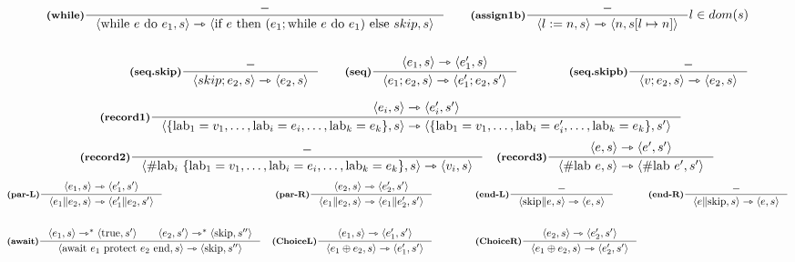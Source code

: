 \documentclass[a4paper, 10pt]{article}
\theoremstyle{definition}
\newcommand{\infer}[4]{\inference[\textbf{#1}]{#2}{#3}#4 }
\newcommand{\srule}[2]{\langle #1 \rangle \rightarrowtriangle \langle #2 \rangle}
\newcommand{\ssrule}[2]{\langle #1 \rangle \rightarrowtriangle^{*} \langle #2 \rangle}
\newcommand{\memrep}[3]{#1 \lbrack #2 \mapsto #3 \rbrack}
\begin{document}
	\begin{align*}
		\infer{(while)}{-}{\srule{\text{while } e \text{ do } e_1, s}{\text{if } e \text{ then } (e_1; \text{while } e \text{ do } e_1) \text{ else } skip, s}}{}\qquad
		\infer{(assign1b)}{-}{\srule{l:=n,s}{n, \memrep{s}{l}{n}}}{l \in dom(s)} \\ \\
		\infer{(seq.skip)}{-}{\srule{skip;e_2,s}{e_2,s}}{}\qquad
		\infer{(seq)}{\srule{e_1,s}{e_1',s}}{\srule{e_1;e_2,s}{e_1';e_2,s'}}{}\qquad\qquad
		\infer{(seq.skipb)}{-}{\srule{v;e_2,s}{e_2,s}}{}
	\end{align*}
	\newpage
	\begin{minipage}{.45\linewidth}
		\begin{flushleft}
			\begin{align*}
				&\infer{(record1)}{\srule{e_i, s}{e_i', s'}}{\srule{\{\text{lab}_1 = v_1, \dots, \text{lab}_i = e_i, \dots, \text{lab}_k = e_k \}, s}{\{\text{lab}_1 = v_1, \dots, \text{lab}_i = e_i', \dots, \text{lab}_k = e_k \}, s'}}{}
			\end{align*}
			\begin{align*}
				&\infer{(record2)}{-}{\srule{\# \text{lab}_i\ \{\text{lab}_1 = v_1, \dots, \text{lab}_i = e_i, \dots, \text{lab}_k = e_k \}, s}{v_i, s}}{}
				&\infer{(record3)}{\srule{e, s}{e', s'}}{\srule{\# \text{lab } e, s}{\# \text{lab } e', s'}}{}
			\end{align*}
			\begin{align*}
				&\infer{(par-L)}{\srule{e_1,s}{e_1', s'}}{\srule{e_1\| e_2, s}{e_1'\| e_2 , s'}}{}
				&\infer{(par-R)}{\srule{e_2,s}{e_2', s'}}{\srule{e_1\| e_2, s}{e_1\| e_2' , s'}}{}\qquad\qquad
				&\infer{(end-L)}{-}{\srule{\textup{skip}\| e, s}{e , s}}{}
				&\infer{(end-R)}{-}{\srule{e \| \textup{skip}, s}{e , s}}{} \\ \\
				&\infer{(await)}{\ssrule{e_1, s}{\textup{true}, s'}\qquad \ssrule{e_2, s'}{\textup{skip}, s''}}{
					\srule{\textup{await}\ e_1\ \textup{protect}\ e_2\ \textup{end}, s}{\textup{skip}, s''}}{}  
				&\infer{(ChoiceL)}{\srule{e_1, s}{e_1', s'}}{\srule{e_1 \oplus e_2, s}{e_1', s'}}{} \qquad\qquad
				&\infer{(ChoiceR)}{\srule{e_2, s}{e_2', s'}}{\srule{e_1 \oplus e_2, s}{e_2', s'}}{} 
			\end{align*}
		

\end{flushleft}
\end{minipage}
\end{document}

